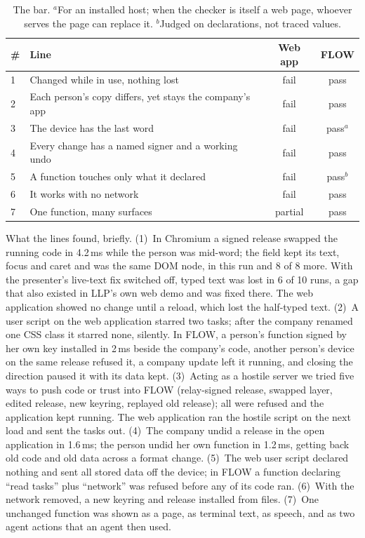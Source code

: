 \documentclass[10pt,twocolumn]{article}
\newcommand{\ms}{\,ms\xspace}
\begin{document}
\begin{table}[t]
\centering\footnotesize
\begin{tabularx}{\columnwidth}{@{}lXcc@{}}
\toprule
\# & Line & Web app & FLOW \\
\midrule
1 & Changed while in use, nothing lost & fail & pass \\
2 & Each person's copy differs, yet stays the company's app & fail & pass \\
3 & The device has the last word & fail & pass$^{a}$ \\
4 & Every change has a named signer and a working undo & fail & pass \\
5 & A function touches only what it declared & fail & pass$^{b}$ \\
6 & It works with no network & fail & pass \\
7 & One function, many surfaces & partial & pass \\
\bottomrule
\end{tabularx}
\caption{The bar. $^{a}$For an installed host; when the checker is itself a web page, whoever serves
the page can replace it. $^{b}$Judged on declarations, not traced values.}
\label{tab:bar}
\end{table}

What the lines found, briefly. (1)~In Chromium a signed release swapped the running code in 4.2\ms
while the person was mid-word; the field kept its text, focus and caret and was the same DOM node,
in this run and 8 of 8 more. With the presenter's live-text fix switched off, typed text was lost in
6 of 10 runs, a gap that also existed in LLP's own web demo and was fixed there. The web application
showed no change until a reload, which lost the half-typed text. (2)~A user script on the web
application starred two tasks; after the company renamed one CSS class it starred none, silently.
In FLOW, a person's function signed by her own key installed in 2\ms beside the company's code,
another person's device on the same release refused it, a company update left it running, and
closing the direction paused it with its data kept. (3)~Acting as a hostile server we tried five
ways to push code or trust into FLOW (relay-signed release, swapped layer, edited release, new
keyring, replayed old release); all were refused and the application kept running. The web
application ran the hostile script on the next load and sent the tasks out. (4)~The company undid
a release in the open application in 1.6\ms; the person undid her own function in 1.2\ms, getting
back old code and old data across a format change. (5)~The web user script declared nothing and
sent all stored data off the device; in FLOW a function declaring ``read tasks'' plus ``network'' was
refused before any of its code ran. (6)~With the network removed, a new keyring and release installed
from files. (7)~One unchanged function was shown as a page, as terminal text, as speech, and as two
agent actions that an agent then used.
\end{document}
